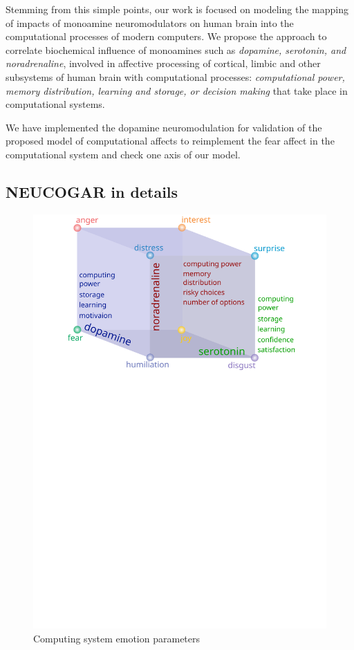 \documentclass[procedia]{easychair}
\begin{document}
Stemming from this simple points, our work is focused on modeling the mapping of impacts of monoamine
neuromodulators on human brain into the computational processes of modern computers.
We propose the approach to correlate biochemical influence of monoamines such as \textit{dopamine, serotonin,
and noradrenaline}, involved in affective processing of cortical, limbic and other subsystems of human brain
with computational processes: \textit{computational power, memory distribution, learning and storage, or decision
making} that take place in computational systems.

We have implemented the dopamine neuromodulation for validation of the proposed model of computational
affects to reimplement the fear affect in the computational system and check one axis of our model.

\subsection{NEUCOGAR in details}
\label{sec:analysis}

\begin{figure}
    \centering
    \includegraphics[width=0.8\columnwidth]{figure3_cube_of_parameters_top}
    \caption{Computing system emotion parameters}
    \label{fig:cube}
\end{figure}
\end{document}
